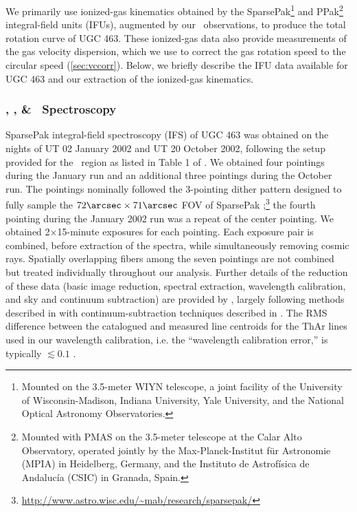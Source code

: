 \documentclass[apj,iop,numberedappendix]{emulateapj}
\begin{document}
We primarily use ionized-gas kinematics obtained by the SparsePak\footnote{
%
Mounted on the 3.5-meter WIYN telescope, a joint facility of the University of
Wisconsin-Madison, Indiana University, Yale University, and the National Optical
Astronomy Observatories.
%
} \citep{2004PASP..116..565B, 2005ApJS..156..311B} and PPak\footnote{
%
Mounted with PMAS on the 3.5-meter telescope at the Calar Alto Observatory,
operated jointly by the Max-Planck-Institut für Astronomie (MPIA) in Heidelberg,
Germany, and the Instituto de Astrofísica de Andalucía (CSIC) in Granada, Spain.
%
} \citep{2004AN....325..151V, 2005PASP..117..620R, 2006PASP..118..129K}
integral-field units (IFUs), augmented by our \hone\ observations, to produce
the total rotation curve of UGC 463.  These ionized-gas data also provide
measurements of the gas velocity dispersion, which we use to correct the gas
rotation speed to the circular speed (\sect \ref{sec:vccorr}).  Below, we
briefly describe the IFU data available for UGC 463 and our extraction of the
ionized-gas kinematics.

\subsubsection{\halp, \niinb, \& \siinb\ Spectroscopy}
\label{sec:spkha}

SparsePak integral-field spectroscopy (IFS) of UGC 463 was obtained on the
nights of UT 02 January 2002 and UT 20 October 2002, following the setup
provided for the \halp\ region as listed in Table 1 of
.  We obtained four pointings during the January
run and an additional three pointings during the October run.  The pointings
nominally followed the 3-pointing dither pattern designed to fully sample the
$72\arcsec\times 71\arcsec$ FOV of SparsePak
\citep{2004PASP..116..565B};\footnote{
%
\url{http://www.astro.wisc.edu/~mab/research/sparsepak/}
%
} the fourth pointing during the January 2002 run was a repeat of the center
pointing.  We obtained 2$\times$15-minute exposures for each pointing.  Each
exposure pair is combined, before extraction of the spectra, while
simultaneously removing cosmic rays.  Spatially overlapping fibers among the
seven pointings are not combined but treated individually throughout our
analysis.  Further details of the reduction of these data (basic image
reduction, spectral extraction, wavelength calibration, and sky and continuum
subtraction) are provided by \haIt, largely following methods described in
\citet{2006ApJS..166..505A} with continuum-subtraction techniques described in
\citet{2005ApJS..156..311B}.  The RMS difference between the catalogued and
measured line centroids for the ThAr lines used in our wavelength calibration,
i.e. the ``wavelength calibration error,'' is typically $\lesssim 0.1$ \kms.
\end{document}
